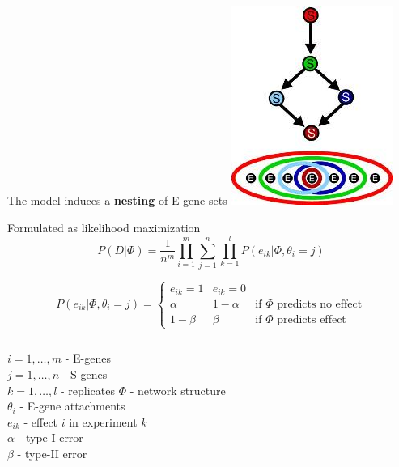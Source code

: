 \documentclass{beamer}
\begin{document}
\begin{frame}{The model induces a \textbf{nesting} of E-gene sets}
\centering
\includegraphics{NestedEffects.jpg}
\end{frame}

\begin{frame}{Formulated as likelihood maximization}
\[ P( D | \Phi ) = \frac{ 1 }{ n^m } \prod_{i=1}^m \sum_{j=1}^n \prod_{k=1}^l P( e_{ik} | \Phi, \theta_i = j ) \]

\[ P( e_{ik} | \Phi, \theta_i = j ) = \left\{
  \begin{array}{ccl}
    e_{ik} = 1 & e_{ik} = 0 \\
    \alpha & 1-\alpha &\text{if } \Phi \text{ predicts no effect} \\
    1-\beta & \beta &\text{if } \Phi \text{ predicts effect}
  \end{array}
 \right.
\]

\scriptsize
\begin{columns}
$i = 1,\ldots,m$ - E-genes \\
$j = 1,\ldots,n$ - S-genes \\
$k = 1, \ldots, l$ - replicates
$\Phi$ - network structure \\
$\theta_i$ - E-gene attachments \\
$e_{ik}$ - effect $i$ in experiment $k$ \\
$\alpha$ - type-I error \\
$\beta$ - type-II error \\
\end{columns}

\vfill


\end{frame}
\end{document}
